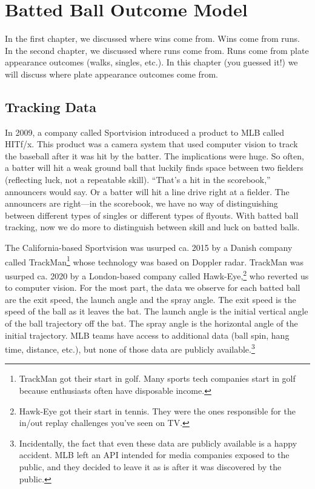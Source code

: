 \documentclass{article}
\begin{document}
\setcounter{section}{2}
\section{\sc Batted Ball Outcome Model}

  In the first chapter, we discussed where wins come from. Wins come from runs. In the second chapter, we discussed where runs come from. Runs come from plate appearance outcomes (walks, singles, etc.). In this chapter (you guessed it!) we will discuss where plate appearance outcomes come from.

  \subsection{\sc Tracking Data}

    In 2009, a company called Sportvision introduced a product to MLB called HITf/x. This product was a camera system that used computer vision to track the baseball after it was hit by the batter. The implications were huge. So often, a batter will hit a weak ground ball that luckily finds space between two fielders (reflecting luck, not a repeatable skill). ``That's a hit in the scorebook,'' announcers would say. Or a batter will hit a line drive right at a fielder. The announcers are right---in the scorebook, we have no way of distinguishing between different types of singles or different types of flyouts. With batted ball tracking, now we do more to distinguish between skill and luck on batted balls.

    The California-based Sportvision was usurped ca. 2015 by a Danish company called TrackMan\footnote{TrackMan got their start in golf. Many sports tech companies start in golf because enthusiasts often have disposable income.} whose technology was based on Doppler radar. TrackMan was usurped ca. 2020 by a London-based company called Hawk-Eye,\footnote{Hawk-Eye got their start in tennis. They were the ones responsible for the in/out replay challenges you've seen on TV.} who reverted us to computer vision. For the most part, the data we observe for each batted ball are the exit speed, the launch angle and the spray angle. The exit speed is the speed of the ball as it leaves the bat. The launch angle is the initial vertical angle of the ball trajectory off the bat. The spray angle is the horizontal angle of the initial trajectory. MLB teams have access to additional data (ball spin, hang time, distance, etc.), but none of those data are publicly available.\footnote{Incidentally, the fact that even these data are publicly available is a happy accident. MLB left an API intended for media companies exposed to the public, and they decided to leave it as is after it was discovered by the public.}
\end{document}
